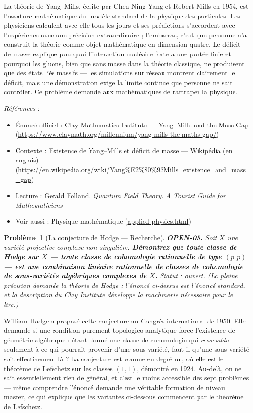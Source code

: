 \documentclass[11pt]{article}
\newtheorem{problem}{Problème}
\newenvironment{refs}{\par\small\noindent\emph{Références :}\begin{itemize}\setlength\itemsep{0pt}}{\end{itemize}\normalsize}
\begin{document}
\noindent La théorie de Yang--Mills, écrite par Chen Ning Yang et Robert Mills en
1954, est l'ossature mathématique du modèle standard de la physique des particules. Les
physiciens calculent avec elle tous les jours et ses prédictions s'accordent avec
l'expérience avec une précision extraordinaire ; l'embarras, c'est que personne n'a
construit la théorie comme objet mathématique en dimension quatre. Le déficit de masse
explique pourquoi l'interaction nucléaire forte a une portée finie et pourquoi les gluons,
bien que sans masse dans la théorie classique, ne produisent que des états liés massifs ---
les simulations sur réseau montrent clairement le déficit, mais une démonstration exige la
limite continue que personne ne sait contrôler. Ce problème demande aux mathématiques de
rattraper la physique.

\begin{refs}
\item Énoncé officiel : Clay Mathematics Institute --- Yang--Mills and the Mass Gap (\url{https://www.claymath.org/millennium/yang-mills-the-maths-gap/})
\item Contexte : Existence de Yang--Mills et déficit de masse --- Wikipédia (en anglais) (\url{https://en.wikipedia.org/wiki/Yang%E2%80%93Mills_existence_and_mass_gap})
\item Lecture : Gerald Folland, \textit{Quantum Field Theory: A Tourist Guide for Mathematicians}
\item Voir aussi : Physique mathématique (\url{applied-physics.html})
\end{refs}

\bigskip

\begin{problem}[{La conjecture de Hodge --- Recherche}]
\textbf{OPEN-05.} Soit $ X $ une variété projective complexe non
singulière. \textbf{Démontrez que toute classe de Hodge sur $ X $ --- toute classe de
cohomologie rationnelle de type $ (p,p) $ --- est une combinaison linéaire rationnelle de
classes de cohomologie de sous-variétés algébriques complexes de $ X $.} Statut :
ouvert. (La pleine précision demande la théorie de Hodge ; l'énoncé ci-dessus est
l'énoncé standard, et la description du Clay Institute développe la machinerie nécessaire
pour le lire.)
\end{problem}

\noindent William Hodge a proposé cette conjecture au Congrès international de
1950. Elle demande si une condition purement topologico-analytique force l'existence de
géométrie algébrique : étant donné une classe de cohomologie qui \textit{ressemble}
seulement à ce qui pourrait provenir d'une sous-variété, faut-il qu'une sous-variété soit
effectivement là ? La conjecture est connue en degré un, où elle est le théorème de
Lefschetz sur les classes $ (1,1) $, démontré en 1924. Au-delà, on ne sait
essentiellement rien de général, et c'est le moins accessible des sept problèmes --- même
comprendre l'énoncé demande une véritable formation de niveau master, ce qui explique que
les variantes ci-dessous commencent par le théorème de Lefschetz.
\end{document}
